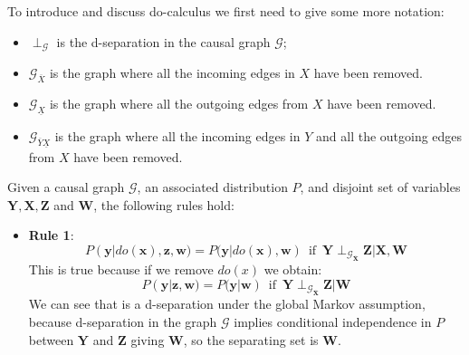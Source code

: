 To introduce and discuss do-calculus we first need to give some more notation:
\begin{itemize}
    \item $\perp_\mathcal{G}$ is the d-separation in the causal graph $\mathcal{G}$;
    \item $\mathcal{G}_{\overline{X}}$ is the graph where all the incoming edges
          in $X$ have been removed.
    \item $\mathcal{G}_{\underline{X}}$ is the graph where all the outgoing edges
          from $X$ have been removed.
    \item $\mathcal{G}_{\overline{Y}\underline{X}}$ is the graph where all the
          incoming edges in $Y$ and all the outgoing edges from $X$ have been removed.
\end{itemize}
\begin{definition}
    Given a causal graph $\mathcal{G}$, an associated distribution $P$, and
    disjoint set of variables $\mathbf{Y}, \mathbf{X}, \mathbf{Z}$ and $\mathbf{W}$,
    the following rules hold:
    \begin{itemize}
        \item \textbf{Rule 1}:
              \begin{equation}
                  P(\mathbf{y} | do(\mathbf{x}), \mathbf{z}, \mathbf{w}) =
                  P(\mathbf{y} | do(\mathbf{x}), \mathbf{w}) \, \text{ if } \, \mathbf{Y}
                  \perp_{\mathcal{G}_{\overline{\mathbf{X}}}} \mathbf{Z} | \mathbf{X}, \mathbf{W}
              \end{equation}
              This is true because if we remove $do(x)$ we obtain:
              \begin{equation*}
                  P(\mathbf{y} |\mathbf{z}, \mathbf{w}) = P(\mathbf{y} | \mathbf{w}) \, \text{ if } \, \mathbf{Y}
                  \perp_{\mathcal{G}_{\overline{\mathbf{X}}}} \mathbf{Z} | \mathbf{W}
              \end{equation*}
              We can see that is a d-separation under the global Markov assumption,
              because d-separation in the graph $\mathcal{G}$ implies conditional
              independence in $P$ between $\mathbf{Y}$ and $\mathbf{Z}$ giving
              $\mathbf{W}$, so the separating set is $\mathbf{W}$.


\end{itemize}
\end{definition}
